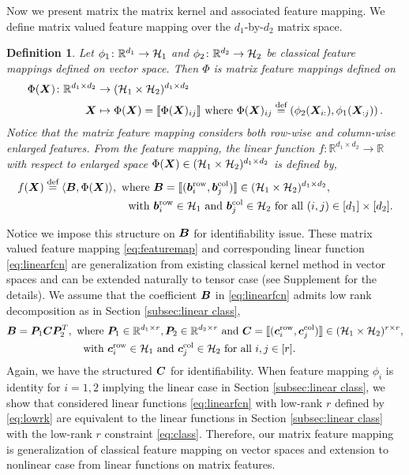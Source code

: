 \documentclass[12pt]{article}
\newtheorem{defn}{Definition}
\begin{document}
Now we present matrix the matrix kernel and associated feature mapping.
We define matrix valued feature mapping over  the $d_1$-by-$d_2$ matrix space.
\begin{defn}\label{def:map}
Let $\phi_1\colon\mathbb{R}^{d_1}\rightarrow \mathcal{H}_1 $ and $\phi_2\colon\mathbb{R}^{d_2}\rightarrow \mathcal{H}_2 $  be classical feature mappings defined on vector space. Then $\Phi$ is matrix feature mappings defined on
\begin{align}\label{eq:featuremap}
    \Phi(\bm X)\colon \mathbb{R}^{d_1\times d_2} &\rightarrow (\mathcal{H}_1\times \mathcal{H}_2)^{d_1\times d_2}\\
    \bm X &\mapsto \Phi(\bm X) = \llbracket \Phi(\bm X)_{ij} \rrbracket\text{ where } \Phi(\bm X)_{ij}\stackrel{\text{def}}{=}\left(\phi_2(\bm X_{i:}),\phi_1(\bm X_{:j})\right).
\end{align}
Notice that the matrix feature mapping considers both row-wise and column-wise enlarged features.
From the feature mapping, the linear function $f\colon \mathbb{R}^{d_1\times d_2}\rightarrow \mathbb{R}$ with respect to enlarged space $\Phi(\bm X)\in(\mathcal{H}_1\times \mathcal{H}_2)^{d_1\times d_2}$ is defined by,
\begin{align}\label{eq:linearfcn}
    f(\bm X) \stackrel{\text{def}}{=}\langle \bm B,\Phi(\bm X) \rangle ,\text{ where }& \bm B=\llbracket (\bm{b}^{\text{row}}_i,\bm{b}^{\text{col}}_j) \rrbracket\in(\mathcal{H}_1\times \mathcal{H}_2)^{d_1\times d_2},\\\text{ with }& \bm{b}^{\text{row}}_i\in\mathcal{H}_1\text{ and } \bm{b}^{\text{col}}_j\in\mathcal{H}_2 \text{ for all } (i,j)\in[d_1]\times[d_2].
\end{align}
\end{defn}
Notice we impose this structure on $\bm B$ for identifiability issue.
These matrix valued feature mapping \eqref{eq:featuremap} and corresponding linear function \eqref{eq:linearfcn} are generalization from existing classical kernel method in vector spaces and can be extended naturally to tensor case (see Supplement for the details).
 We assume that the coefficient $\bm B$ in \eqref{eq:linearfcn} admits low rank decomposition as in Section \ref{subsec:linear class}, 
 \begin{align}\label{eq:lowrk}
     \bm B = \bm{P}_1\bm C\bm{P}_2^T,\text{ where }& \bm{P}_1\in\mathbb{R}^{d_1\times r},\bm{P}_2\in\mathbb{R}^{d_2\times r} \text{ and } \bm C = \llbracket (\bm{c}_i^{\text{row}},\bm{c}_j^{\text{col}}) \rrbracket\in(\mathcal{H}_1\times \mathcal{H}_2)^{r\times r},\\
     \text{ with }&\bm{c}^{\text{row}}_i\in\mathcal{H}_1\text{ and } \bm{c}^{\text{col}}_j\in\mathcal{H}_2 \text{ for all } i,j\in[r].
 \end{align}
 Again, we have the structured $\bm C$ for identifiability. 
  When feature mapping $\phi_i$ is identity for $i=1,2$ implying the linear case in Section \ref{subsec:linear class}, we show that considered linear functions \eqref{eq:linearfcn} with low-rank $r$ defined by \eqref{eq:lowrk} are equivalent to the linear functions in Section \ref{subsec:linear class} with the low-rank $r$ constraint \eqref{eq:class}.
  Therefore, our matrix feature mapping is generalization of classical feature mapping on vector spaces and extension to nonlinear case from linear functions on matrix features.
  
\end{document}
